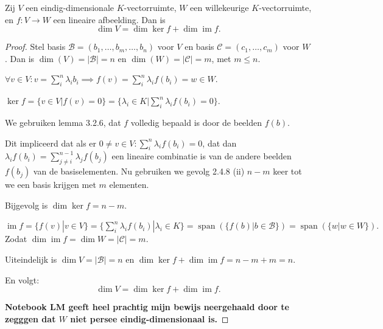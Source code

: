 \begin{stelling}
    Zij $V$ een eindig-dimensionale $K$-vectorruimte, $W$ een willekeurige $K$-vectorruimte,
    en $f \colon V \to W$ een lineaire afbeelding. Dan is
    \[ \dim V = \dim \ker f + \dim \operatorname{im} f. \]
\end{stelling}
\begin{proof}
    Stel basis \(\mathcal{B} = (b_1,\dots, b_m,\dots,b_n)\) voor \(V\) en  basis \(\mathcal{C} = (c_1,\dots,c_m)\) voor \(W\).
    Dan is \(\dim(V) = |\mathcal{B}| = n\) en \(\dim(W) = |\mathcal{C}| = m\), met \(m \leq n\).

    \(\forall v \in V: v = \sum_{i}^{n} \lambda_i b_i \implies f(v) = \sum_{i}^{n} \lambda_i f(b_i) = w \in W \).

    \(\ker f 
    = \{v \in V | f(v) = 0\}
    = \{\lambda_i \in K | \sum_{i}^{n} \lambda_i f(b_i) = 0\}
    \).

    We gebruiken lemma 3.2.6, dat \(f\) volledig bepaald is door de beelden \(f(b)\). 

    Dit impliceerd dat als er \(0 \neq v \in V: \sum_{i}^{n} \lambda_i f(b_i) = 0 \), dat dan \(\lambda_i f(b_i) =  \sum_{j\neq i}^{n-1}\lambda_j f(b_j)\) een lineaire combinatie is van de andere beelden \(f(b_j)\) van de basiselementen.
    Nu gebruiken we gevolg 2.4.8 (ii) \(n-m\) keer tot we een basis krijgen met \(m\) elementen.

    Bijgevolg is \(\dim\ker f = n-m\).

    \(\operatorname{im} f
     = \{f(v)|v \in V\}
     = \{\sum_{i}^{n} \lambda_i f(b_i)|\lambda_i \in K\}
     = \operatorname{span}(\{f(b)|b\in \mathcal{B}\})
     = \operatorname{span}(\{w|w\in W\}).
     \)
     Zodat \(\dim\operatorname{im} f = \dim W = |\mathcal{C}| = m\).

     Uiteindelijk is \(\dim V = |\mathcal{B}| = n \) en \(\dim\ker f + \dim\operatorname{im} f = n-m+m = n \).

     En volgt:
     \[ \dim V = \dim \ker f + \dim \operatorname{im} f.\]

    \textbf{Notebook LM geeft heel prachtig mijn bewijs neergehaald door te zegggen dat \(W\) niet persee eindig-dimensionaal is.}
\end{proof}

